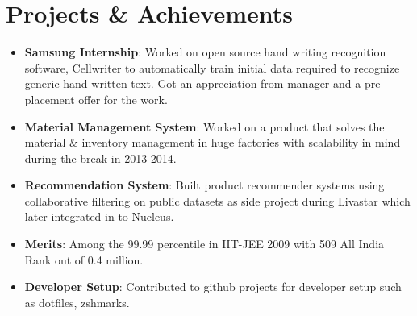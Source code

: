 \documentclass[letterpaper,11pt]{article}
\newcommand{\resumeItem}[2]{
  \item\small{
    \textbf{#1}{: #2 \vspace{-2pt}}
  }
}
\newcommand{\resumeSubItem}[2]{\resumeItem{#1}{#2}\vspace{-4pt}}
\newcommand{\resumeSubHeadingListStart}{\begin{itemize}[leftmargin=*]}
\newcommand{\resumeSubHeadingListEnd}{\end{itemize}}
\begin{document}
\section{Projects \& Achievements}
  \resumeSubHeadingListStart
    \resumeSubItem{Samsung Internship}
      {Worked on open source hand writing recognition software, Cellwriter to automatically train initial data required to recognize generic hand written text. Got an appreciation from manager and a pre-placement offer for the work.}
    \resumeSubItem{Material Management System}
      {Worked on a product that solves the material \& inventory management in huge factories with scalability in mind during the break in 2013-2014.}
    \resumeSubItem{Recommendation System}
      {Built product recommender systems using collaborative filtering on public datasets as side project during Livastar which later integrated in to Nucleus.}
    \resumeSubItem{Merits}
      {Among the 99.99 percentile in IIT-JEE 2009 with 509 All India Rank out of 0.4 million.}
    \resumeSubItem{Developer Setup}
      {Contributed to github projects for developer setup such as dotfiles, zshmarks.}
  \resumeSubHeadingListEnd

%


\end{document}
